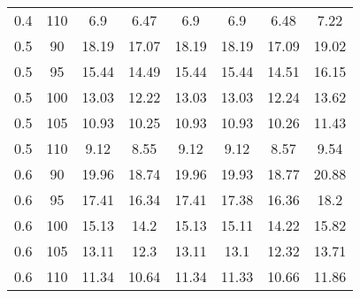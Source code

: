 \documentclass{article}
\begin{document}
\begin{table}[H]
\begin{tabular}{|c|c|c|c|c|c|c|c|}
  0.4 & 110 & 6.9 & 6.47 & 6.9 & 6.9 & 6.48 & 7.22 \\
  0.5 & 90 & 18.19 & 17.07 & 18.19 & 18.19 & 17.09 & 19.02 \\
  0.5 & 95 & 15.44 & 14.49 & 15.44 & 15.44 & 14.51 & 16.15 \\
  0.5 & 100 & 13.03 & 12.22 & 13.03 & 13.03 & 12.24 & 13.62 \\
  0.5 & 105 & 10.93 & 10.25 & 10.93 & 10.93 & 10.26 & 11.43 \\
  0.5 & 110 & 9.12 & 8.55 & 9.12 & 9.12 & 8.57 & 9.54 \\
  0.6 & 90 & 19.96 & 18.74 & 19.96 & 19.93 & 18.77 & 20.88 \\
  0.6 & 95 & 17.41 & 16.34 & 17.41 & 17.38 & 16.36 & 18.2 \\
  0.6 & 100 & 15.13 & 14.2 & 15.13 & 15.11 & 14.22 & 15.82 \\
  0.6 & 105 & 13.11 & 12.3 & 13.11 & 13.1 & 12.32 & 13.71 \\
  0.6 & 110 & 11.34 & 10.64 & 11.34 & 11.33 & 10.66 & 11.86 \\
  \hline
  \end{tabular}
\end{table}
\end{document}
